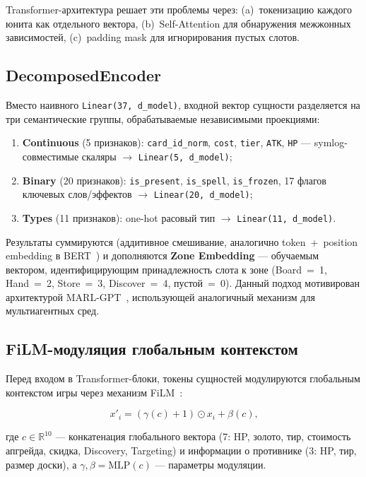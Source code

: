 \documentclass[a4paper,12pt]{extarticle}
\begin{document}
Transformer-архитектура решает эти проблемы через: (a)~токенизацию каждого юнита как отдельного вектора, (b)~Self-Attention для обнаружения межжонных зависимостей, (c)~padding mask для игнорирования пустых слотов.

\subsection{DecomposedEncoder}

Вместо наивного \texttt{Linear(37, d\_model)}, входной вектор сущности разделяется на три семантические группы, обрабатываемые независимыми проекциями:

\begin{enumerate}[noitemsep]
  \item \textbf{Continuous} (5 признаков): \texttt{card\_id\_norm}, \texttt{cost}, \texttt{tier}, \texttt{ATK}, \texttt{HP} --- symlog-совместимые скаляры $\to$ \texttt{Linear(5, d\_model)};
  \item \textbf{Binary} (20 признаков): \texttt{is\_present}, \texttt{is\_spell}, \texttt{is\_frozen}, 17 флагов ключевых слов/эффектов $\to$ \texttt{Linear(20, d\_model)};
  \item \textbf{Types} (11 признаков): one-hot расовый тип $\to$ \texttt{Linear(11, d\_model)}.
\end{enumerate}

Результаты суммируются (аддитивное смешивание, аналогично token~+~position embedding в BERT~\cite{preln}) и дополняются \textbf{Zone Embedding} --- обучаемым вектором, идентифицирующим принадлежность слота к зоне (Board~=~1, Hand~=~2, Store~=~3, Discover~=~4, пустой~=~0). Данный подход мотивирован архитектурой MARL-GPT~\cite{marl_gpt}, использующей аналогичный механизм для мультиагентных сред.

\subsection{FiLM-модуляция глобальным контекстом}

Перед входом в Transformer-блоки, токены сущностей модулируются глобальным контекстом игры через механизм FiLM~\cite{film}:

\begin{equation}
x'_i = (\gamma(c) + 1) \odot x_i + \beta(c)\text{,}
\end{equation}

где $c \in \mathbb{R}^{10}$ --- конкатенация глобального вектора (7: HP, золото, тир, стоимость апгрейда, скидка, Discovery, Targeting) и информации о противнике (3: HP, тир, размер доски), а $\gamma, \beta = \text{MLP}(c)$ --- параметры модуляции.
\end{document}
